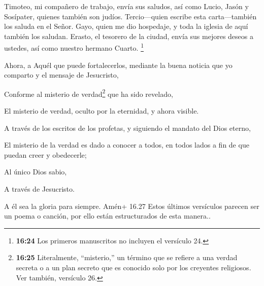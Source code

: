  Timoteo, mi compañero de trabajo, envía sus saludos, así
como Lucio, Jasón y Sosípater, quienes también son judíos. 
Tercio---quien escribe esta carta---también los saluda en el Señor.
 Gayo, quien me dio hospedaje, y toda la iglesia de aquí
también los saludan. Erasto, el tesorero de la ciudad, envía sus mejores
deseos a ustedes, así como nuestro hermano Cuarto. 
\footnote{\textbf{16:24} Los primeros manuscritos no incluyen el
  versículo 24.}

 Ahora, a Aquél que puede fortalecerlos, mediante la buena
noticia que yo comparto y el mensaje de Jesucristo,

Conforme al misterio de verdad\footnote{\textbf{16:25} Literalmente,
  ``misterio,'' un término que se refiere a una verdad secreta o a un
  plan secreto que es conocido solo por los creyentes religiosos. Ver
  también, versículo 26.} que ha sido revelado,

El misterio de verdad, oculto por la eternidad,  y ahora
visible.

A través de los escritos de los profetas, y siguiendo el mandato del
Dios eterno,

El misterio de la verdad es dado a conocer a todos, en todos lados a fin
de que puedan creer y obedecerle;

 Al único Dios sabio,

A través de Jesucristo.

A él sea la gloria para siempre. Amén+ 16.27 Estos últimos versículos
parecen ser un poema o canción, por ello están estructurados de esta
manera..
